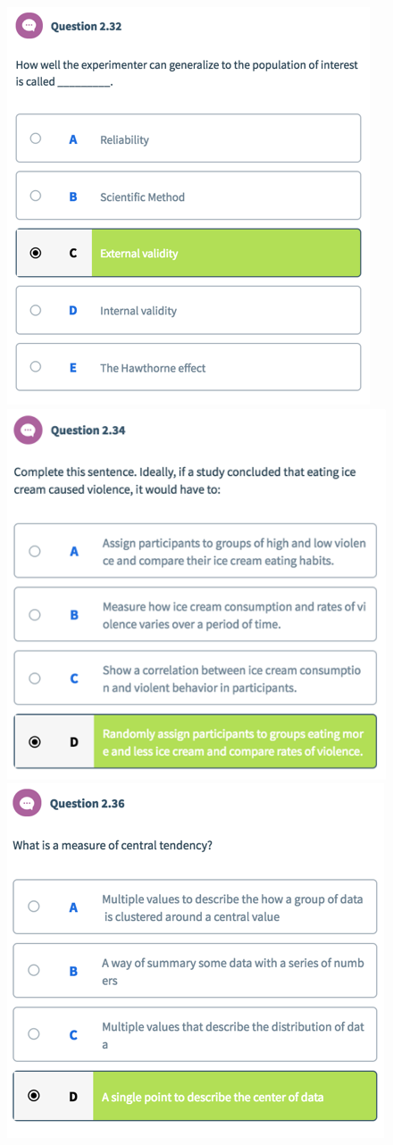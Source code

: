 \documentclass{article}
\begin{document}
 	\begin{figure}[H]
 		\centering
 		\includegraphics{psy100/0232}
 		\includegraphics{psy100/0234}
 		\includegraphics{psy100/0236}	

\end{figure}
\end{document}

